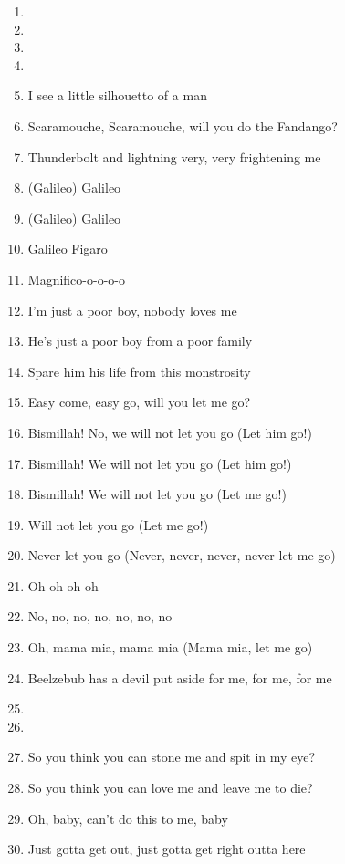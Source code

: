 \documentclass{article}
\begin{document}
\begin{center}
\begin{enumerate}
            \item[]
            \item[] \instrumental

            \item[]
            \item[] 
            \item I see a little silhouetto of a man
            \item Scaramouche, Scaramouche, will you do the Fandango?
            \item Thunderbolt and lightning very, very frightening me
            \item (Galileo) Galileo
            \item (Galileo) Galileo
            \item Galileo Figaro
            \item Magnifico-o-o-o-o
            \item I'm just a poor boy, nobody loves me
            \item He's just a poor boy from a poor family
            \item Spare him his life from this monstrosity
            \item Easy come, easy go, will you let me go?
            \item Bismillah! No, we will not let you go (Let him go!)
            \item Bismillah! We will not let you go (Let him go!)
            \item Bismillah! We will not let you go (Let me go!)
            \item Will not let you go (Let me go!)
            \item Never let you go (Never, never, never, never let me go)
            \item Oh oh oh oh
            \item No, no, no, no, no, no, no
            \item Oh, mama mia, mama mia (Mama mia, let me go)
            \item Beelzebub has a devil put aside for me, for me, for me
            
            \pagebreak

            \item[]
            \item[] 
            \item So you think you can stone me and spit in my eye?
            \item So you think you can love me and leave me to die?
            \item Oh, baby, can't do this to me, baby
            \item Just gotta get out, just gotta get right outta here


\end{enumerate}
\end{center}
\end{document}
